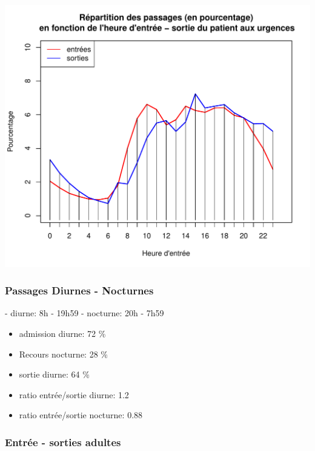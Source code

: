 \documentclass[12pt,english,french,twoside]{book}\usepackage[]{graphicx}\usepackage[]{color}
\makeatletter
\def\maxwidth{ %
  \ifdim\Gin@nat@width>\linewidth
    \linewidth
  \else
    \Gin@nat@width
  \fi
}
\newenvironment{knitrout}{}{} %
\makeatother
\begin{document}
\begin{knitrout}
\color{fgcolor}
\includegraphics[width=\maxwidth]{figure/sau_arrive_depart} 

\end{knitrout}


\subsubsection*{Passages Diurnes - Nocturnes}

- diurne: 8h - 19h59
- nocturne: 20h - 7h59





\begin{boxedminipage}{10cm}
\begin{itemize}
  \item admission diurne: 72 \%
  \item Recours nocturne: 28 \%
  \item sortie diurne:    64 \%
  \item ratio entrée/sortie diurne: 1.2
  \item ratio entrée/sortie nocturne: 0.88
\end{itemize}
\end{boxedminipage}

\subsubsection*{Entrée - sorties adultes}
\end{document}
